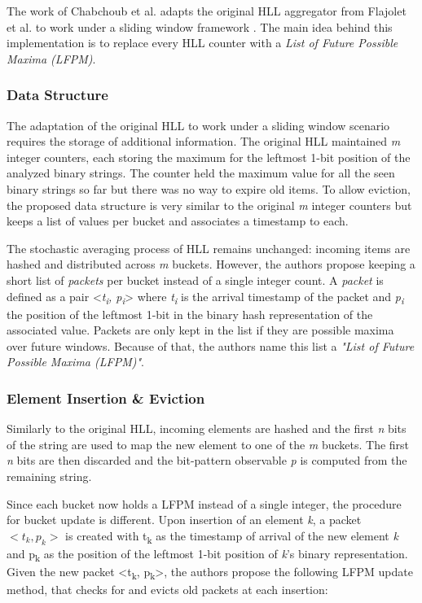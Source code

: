 The work of Chabchoub et al. adapts the original HLL aggregator from Flajolet et al. to work under a sliding window framework  \cite{Chabchoub-Sliding-HLL}.
The main idea behind this implementation is to replace every HLL counter with a \textit{List of Future Possible Maxima (LFPM)}.

\subsubsection*{Data Structure}

The adaptation of the original HLL to work under a sliding window scenario requires the storage of additional information. The original HLL maintained \textit{m} integer counters, each storing the maximum for the leftmost 1-bit position of the analyzed binary strings.  The counter held the maximum value for all the seen binary strings so far but there was no way to expire old items. To allow eviction, the proposed data structure is very similar to the original \textit{m} integer counters but keeps a list of values per bucket and associates a timestamp to each. 

The stochastic averaging process of HLL remains unchanged: incoming items are hashed and distributed across \textit{m} buckets. However, the authors propose keeping a short list of \textit{packets} per bucket instead of a single integer count. A \textit{packet} is defined as a pair <\textit{t\textsubscript{i}, p\textsubscript{i}}> where \textit{t\textsubscript{i}} is the arrival timestamp of the packet and \textit{p\textsubscript{i}} the position of the leftmost 1-bit in the binary hash representation of the associated value. Packets are only kept in the list if they are possible maxima over future windows. Because of that, the authors name this list a \textit{"List of Future Possible Maxima (LFPM)"}.

\subsubsection*{Element Insertion \& Eviction}
Similarly to the original HLL, incoming elements are hashed and the first \textit{n} bits of the string are used to map the new element to one of the \textit{m} buckets. The first \textit{n} bits are then discarded and the bit-pattern observable \textit{p} is computed from the remaining string. 

Since each bucket now holds a LFPM instead of a single integer, the procedure for bucket update is different. Upon insertion of an element \textit{k}, a packet $<t_k, p_k>$ is created with t\textsubscript{k} as the timestamp of arrival of the new element \textit{k} and p\textsubscript{k} as the position of the leftmost 1-bit position of \textit{k}'s binary representation. Given the new packet <t\textsubscript{k}, p\textsubscript{k}>, the authors propose the following LFPM update method, that checks for and evicts old packets at each insertion:

